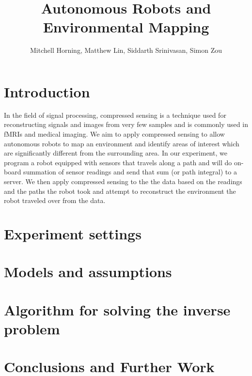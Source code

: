 \documentclass[english]{article}\usepackage[]{graphicx}\usepackage[]{color}
\begin{document}
\title{Autonomous Robots and Environmental Mapping}

\author{Mitchell Horning, Matthew Lin, Siddarth Srinivasan, Simon Zou}

\maketitle

\tableofcontents

\section{Introduction}

In the field of signal processing, compressed sensing is a technique used for 
reconstructing signals and images from very few samples and is commonly used in 
fMRIs and medical imaging. We aim to apply compressed sensing to allow 
autonomous robots to map an environment and identify areas of interest which 
are significantly different from the surrounding area. In our experiment, we  
program a robot equipped with sensors that travels along a path and will do on-
board summation of sensor readings and send that sum (or path integral) to a 
server. We then apply compressed sensing to the the data based on the readings 
and the paths the robot took and attempt to reconstruct the environment the 
robot traveled over from the data. 


\section{Experiment settings}

\section{Models and assumptions}

\section{Algorithm for solving the inverse problem}

\section{Conclusions and Further Work}
\end{document}
